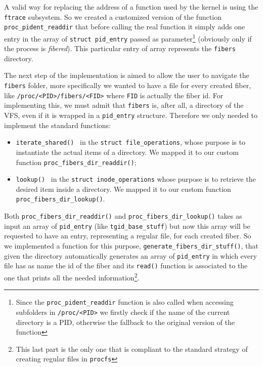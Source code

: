 \documentclass[a4paper,10pt]{article}
\begin{document}
  A valid way for replacing the address of a function used by the kernel is using the \lstinline{ftrace} subsystem. So we created a customized version of the function \lstinline{proc_pident_readdir} that before calling the real function it simply adds one entry in the array of \lstinline{struct pid_entry} passed as parameter\footnote{Since the \lstinline{proc_pident_readdir} function is also called when accessing subfolders in \lstinline{/proc/<PID>} we firstly check if the name of the current directory is a PID, otherwise the fallback to the original version of the function} (obviously only if the process is \textit{fibered}). This particular entry of array represents the \texttt{fibers} directory.

  The next step of the implementation is aimed to allow the user to navigate the \texttt{fibers} folder, more specifically we wanted to have a file for every created fiber, like \lstinline{/proc/<PID>/fibers/<FID>} where \texttt{FID} is actually the fiber id. For implementing this, we must admit that \texttt{fibers} is, after all, a directory of the VFS, even if it is wrapped in a \lstinline{pid_entry} structure. Therefore we only needed to implement the standard functions:
  \begin{itemize}
    \item \lstinline{iterate_shared()}~\cite{kern_file_ops_iterate} in the \lstinline{struct file_operations}, whose purpose is to instantiate the actual items of a directory. We mapped it to our custom function \lstinline{proc_fibers_dir_readdir()};
    \item \lstinline{lookup()}~\cite{kern_inode_ops_lookup} in the \lstinline{struct inode_operations} whose purpose is to retrieve the desired item inside a directory. We mapped it to our custom function \lstinline{proc_fibers_dir_lookup()}.
  \end{itemize}
  Both \lstinline{proc_fibers_dir_readdir()} and \lstinline{proc_fibers_dir_lookup()} takes as input an array of \lstinline{pid_entry} (like \lstinline{tgid_base_stuff}) but now this array will be requested to have an entry, representing a regular file, for each created fiber. So we implemented a function for this purpose, \lstinline{generate_fibers_dir_stuff()}, that given the directory automatically generates an array of \lstinline{pid_entry} in which every file has as name the id of the fiber and its \lstinline{read()} function is associated to the one that prints all the needed information\footnote{This last part is the only one that is compliant to the standard strategy of creating regular files in \texttt{procfs}}.
\end{document}
